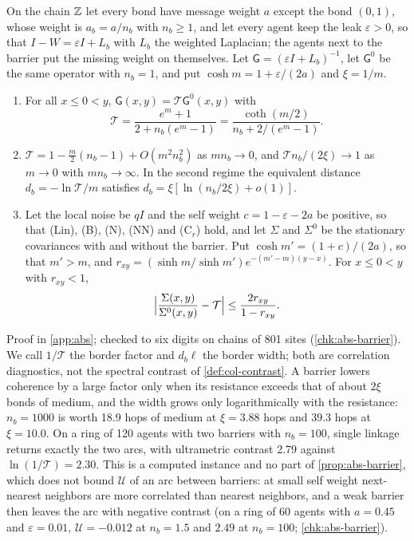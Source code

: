 \begin{proposition}\label{prop:abs-barrier}
On the chain $\mathbb{Z}$ let every bond have message weight $a$ except the bond $(0,1)$, whose weight is $a_b=a/n_b$ with $n_b\ge1$, and let every agent keep the leak $\varepsilon>0$, so that $I-W=\varepsilon I+L_b$ with $L_b$ the weighted Laplacian; the agents next to the barrier put the missing weight on themselves. Let $\mathsf G=(\varepsilon I+L_b)^{-1}$, let $\mathsf G^0$ be the same operator with $n_b=1$, and put $\cosh m=1+\varepsilon/(2a)$ and $\xi=1/m$.
\begin{enumerate}
\item[(a)] For all $x\le0<y$, $\mathsf G(x,y)=\mathcal T\mathsf G^0(x,y)$ with
\[
\mathcal T=\frac{e^m+1}{2+n_b(e^m-1)}=\frac{\coth(m/2)}{n_b+2/(e^m-1)}.
\]
\item[(b)] $\mathcal T=1-\frac m2(n_b-1)+O(m^2n_b^2)$ as $mn_b\to0$, and $\mathcal Tn_b/(2\xi)\to1$ as $m\to0$ with $mn_b\to\infty$. In the second regime the equivalent distance $d_b=-\ln\mathcal T/m$ satisfies $d_b=\xi[\ln(n_b/2\xi)+o(1)]$.
\item[(c)] Let the local noise be $qI$ and the self weight $c=1-\varepsilon-2a$ be positive, so that (Lin), (B), (N), (NN) and (C$_r$) hold, and let $\Sigma$ and $\Sigma^0$ be the stationary covariances with and without the barrier. Put $\cosh m'=(1+c)/(2a)$, so that $m'>m$, and $r_{xy}=(\sinh m/\sinh m')e^{-(m'-m)(y-x)}$. For $x\le0<y$ with $r_{xy}<1$,
\[
\Bigl\lvert\frac{\Sigma(x,y)}{\Sigma^0(x,y)}-\mathcal T\Bigr\rvert\le\frac{2r_{xy}}{1-r_{xy}}.
\]
\end{enumerate}
\end{proposition}

Proof in \cref{app:abs}; checked to six digits on chains of 801 sites (\cref{chk:abs-barrier}). We call $1/\mathcal T$ the border factor and $d_b\ell$ the border width; both are correlation diagnostics, not the spectral contrast of \cref{def:col-contrast}. A barrier lowers coherence by a large factor only when its resistance exceeds that of about $2\xi$ bonds of medium, and the width grows only logarithmically with the resistance: $n_b=1000$ is worth 18.9 hops of medium at $\xi=3.88$ hops and 39.3 hops at $\xi=10.0$. On a ring of 120 agents with two barriers with $n_b=100$, single linkage returns exactly the two arcs, with ultrametric contrast 2.79 against $\ln(1/\mathcal T)=2.30$. This is a computed instance and no part of \cref{prop:abs-barrier}, which does not bound $\mathcal U$ of an arc between barriers: at small self weight next-nearest neighbors are more correlated than nearest neighbors, and a weak barrier then leaves the arc with negative contrast (on a ring of 60 agents with $a=0.45$ and $\varepsilon=0.01$, $\mathcal U=-0.012$ at $n_b=1.5$ and $2.49$ at $n_b=100$; \cref{chk:abs-barrier}).

